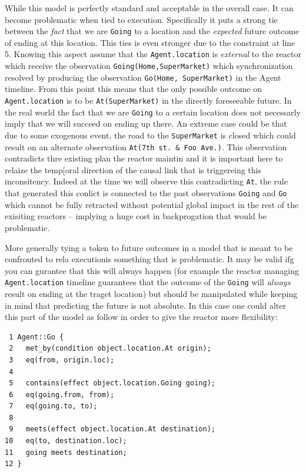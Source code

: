 While this model is perfectly standard and acceptable in the overall
case. It can become problematic when tied to execution. Specifically it
puts a strong tie between the {\em fact} that we are \texttt{Going} to a
location and the {\em expected} future outcome of ending at this
location. This ties is even stronger due to the constraint at line 5.
Knowing this aspect assume that the \texttt{Agent.location} is {\em
  external} to the reactor which receive the observation
\texttt{Going(Home,SuperMarket)} which synchronization resolved by
producing the observation \texttt{Go(Home, SuperMarket)} in the Agent
timeline. From this point this means that the only possible outcome on
\texttt{Agent.location} is to be \texttt{At(SuperMarket)} in the
directly foreseeable future. In the real world the fact that we are
\texttt{Going} to a certain location does not necessarly imply that we
will succeed on ending up there. An extreme case could be that due to
some exogenous event, the road to the \texttt{SuperMarket} is closed
which could result on an alternate observation \texttt{At(7th st. \& Foo
  Ave.)}. This observation contradicts thre existing plan the reactor
maintin and it is important here to relaize the temp[oral direction of
the causal link that is triggereing this inconsitency. Indeed at the
time we will observe this contradicting \texttt{At}, the rule that
generated this conlict is connected to the past observations
\texttt{Going} and \texttt{Go} which cannot be fully retracted without
potential global impact in the rest of the exisiting reactors --
implying a huge cost in backprogation that would be problematic.

More generally tying a token to future outcomes in a model that is meant
to be confronted to rela 
executionis something that is problematic. It may be valid ifg you can
gurantee that this will always happen (for example the reactor
managing \texttt{Agent.location} timeline guarantees that the outcome
of the \texttt{Going} will {\em always} result on ending at the traget
location) but should be manipulated while keeping in mind that
predicting the future is not absolute. In this case one could alter
this part of the model as follow in order to give the reactor more
flexibility:

\begin{verbatim}
 1 Agent::Go {
 2   met_by(condition object.location.At origin);
 3   eq(from, origin.loc);
 4
 5   contains(effect object.location.Going going);
 6   eq(going.from, from);
 7   eq(going.to, to);
 8   
 9   meets(effect object.location.At destination);
10   eq(to, destination.loc);
11   going meets destination;
12 }
\end{verbatim}


